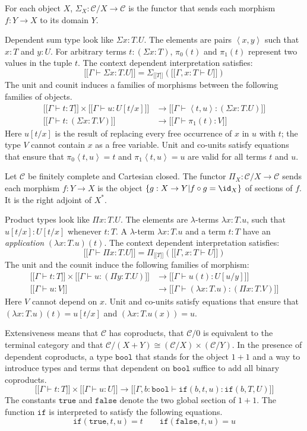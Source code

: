 \documentclass{tac}
\newcommand\cat\mathcal
\newcommand\set[1]{\left\{#1\right\}}
\newcommand\ri{^*}
\newcommand\of{:}
\newcommand\db[1]{{[\![}#1{]\!]}}
\newcommand\dsum{\Sigma_}
\newcommand\dprod{\Pi_}
\newcommand\tuplet[1]{\left\langle #1 \right\rangle}
\newcommand\true{\mathtt{true}}
\newcommand\false{\mathtt{false}}
\newcommand\bool{\mathtt{bool}}
\newcommand\ttif{\mathtt{if}}
\begin{document}
For each object $X$, $\dsum X\of\cat C/X\to \cat C$ is the functor that sends each morphism $f\of Y\to X$ to its domain $Y$.

Dependent sum type look like $\Sigma x\of T.U$. The elements are pairs $\tuplet{x,y}$ such that $x\of T$ and $y\of U$. For arbitrary terms $t\of(\Sigma x\of T)$, $\pi_0(t)$ and $\pi_1(t)$ represent two values in the tuple $t$. The context dependent interpretation satisfies:
\[ \db{\Gamma\vdash\Sigma x\of T.U} = \dsum {\db T}(\db{\Gamma,x\of T\vdash U}) \]
The unit and counit induces a families of morphisms between the following families of objects.
\begin{align*}
\db{\Gamma\vdash t\of T}\times\db{\Gamma\vdash u\of U[t/x]} &\to \db{\Gamma\vdash \tuplet{t, u}\of(\Sigma x\of T.U)}\\
\db{\Gamma\vdash t\of (\Sigma x\of T.V)}&\to \db{\Gamma\vdash \pi_1(t) \of V}
\end{align*}
Here $u[t/x]$ is the result of replacing every free occurrence of $x$ in $u$ with $t$; the type $V$ cannot contain $x$ as a free variable. Unit and co-units satisfy equations that ensure that $\pi_0\tuplet{t,u}=t$ and $\pi_1\tuplet{t,u}=u$ are valid for all terms $t$ and $u$.


Let $\cat C$ be finitely complete and Cartesian closed. The functor $\dprod X\of\cat C/X\to \cat C$ sends each morphism $f\of Y\to X$ is the object $\set{g\of X\to Y| f\circ g = \id_X }$ of sections of $f$. It is the right adjoint of $X\ri$.

Product types look like $\Pi x\of T.U$. The elements are $\lambda$-terms $\lambda x\of T.u$, such that $u[t/x]\of U[t/x]$ whenever $t\of T$. A $\lambda$-term $\lambda x\of T.u$ and a term $t\of T$ have an \emph{application} $(\lambda x\of T.u)(t)$. The context dependent interpretation satisfies:
\[ \db{\Gamma\vdash\Pi x\of T.U} = \dprod {\db T}(\db{\Gamma,x\of T\vdash U}) \]
The unit and the counit induce the following families of morphism:
\begin{align*}
\db{\Gamma\vdash t\of T}\times\db{\Gamma\vdash u\of(\Pi y\of T.U)}&\to\db{\Gamma\vdash u(t)\of U[u/y]}\\
\db{\Gamma\vdash u\of V}&\to\db{\Gamma\vdash (\lambda x\of T.u)\of(\Pi x\of T.V)}
\end{align*}
Here $V$ cannot depend on $x$. Unit and co-units satisfy equations that ensure that $(\lambda x\of T.u)(t) = u[t/x]$ and $(\lambda x\of T.u(x))=u$.

Extensiveness means that $\cat C$ has coproducts, that $\cat C/0$ is equivalent to the terminal category and that $\cat C/(X+Y)\cong (\cat C/X)\times(\cat C/Y)$. In the presence of dependent coproducts, a type $\bool$ that stands for the object $1+1$ and a way to introduce types and terms that dependent on $\bool$ suffice to add all binary coproducts.
\[ \db{\Gamma\vdash t\of T}\times\db{\Gamma\vdash u\of U}\to\db{\Gamma,b\of\bool\vdash \ttif(b,t,u)\of\ttif(b,T,U)} \]
The constants $\true$ and $\false$ denote the two global section of $1+1$. The function $\ttif$ is interpreted to satisfy the following equations.
\[ \ttif(\true,t,u)=t\qquad\ttif(\false,t,u) = u\]
\end{document}
